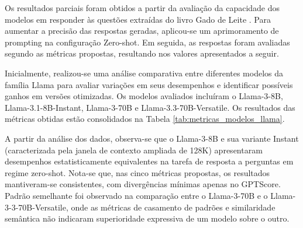 Os resultados parciais foram obtidos a partir da avaliação da capacidade dos modelos em responder às questões extraídas do livro Gado de Leite \cite{embrapa2012gadoleite}. Para aumentar a precisão das respostas geradas, aplicou-se um aprimoramento de prompting na configuração Zero-shot. Em seguida, as respostas foram avaliadas segundo as métricas propostas, resultando nos valores apresentados a seguir.



Inicialmente, realizou-se uma análise comparativa entre diferentes modelos da família Llama para avaliar variações em seus desempenhos e identificar possíveis ganhos em versões otimizadas. Os modelos avaliados incluíram o Llama-3-8B, Llama-3.1-8B-Instant, Llama-3-70B e Llama-3.3-70B-Versatile. Os resultados das métricas obtidas estão consolidados na Tabela \ref{tab:metricas_modelos_llama}.


\begin{table}[h]
\centering

\caption{Comparação de métricas entre modelos LLAMA}
\label{tab:metricas_modelos_llama}
\end{table}

A partir da análise dos dados, observa-se que o Llama-3-8B e sua variante Instant (caracterizada pela janela de contexto ampliada de 128K) apresentaram desempenhos estatisticamente equivalentes na tarefa de resposta a perguntas em regime zero-shot. Nota-se que, nas cinco métricas propostas, os resultados mantiveram-se consistentes, com divergências mínimas apenas no GPTScore. Padrão semelhante foi observado na comparação entre o Llama-3-70B e o Llama-3-3-70B-Versatile, onde as métricas de casamento de padrões e similaridade semântica não indicaram superioridade expressiva de um modelo sobre o outro.

